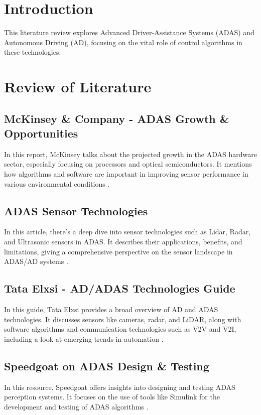 \documentclass[12pt]{report}
\begin{document}


\chapter{Introduction}
This literature review explores Advanced Driver-Assistance Systems (ADAS) and Autonomous Driving (AD), focusing on the vital role of control algorithms in these technologies.

\chapter{Review of Literature}

\section{McKinsey \& Company - ADAS Growth \& Opportunities}
In this report, McKinsey talks about the projected growth in the ADAS hardware sector, especially focusing on processors and optical semiconductors. It mentions how algorithms and software are important in improving sensor performance in various environmental conditions \citep{mckinsey2024}.

\section{ADAS Sensor Technologies}
In this article, there's a deep dive into sensor technologies such as Lidar, Radar, and Ultrasonic sensors in ADAS. It describes their applications, benefits, and limitations, giving a comprehensive perspective on the sensor landscape in ADAS/AD systems \citep{sensorTech2024}.

\section{Tata Elxsi - AD/ADAS Technologies Guide}
In this guide, Tata Elxsi provides a broad overview of AD and ADAS technologies. It discusses sensors like cameras, radar, and LiDAR, along with software algorithms and communication technologies such as V2V and V2I, including a look at emerging trends in automation \citep{tataElxsi2024}.

\section{Speedgoat on ADAS Design \& Testing}
In this resource, Speedgoat offers insights into designing and testing ADAS perception systems. It focuses on the use of tools like Simulink for the development and testing of ADAS algorithms \citep{speedgoat2024}.
\end{document}
